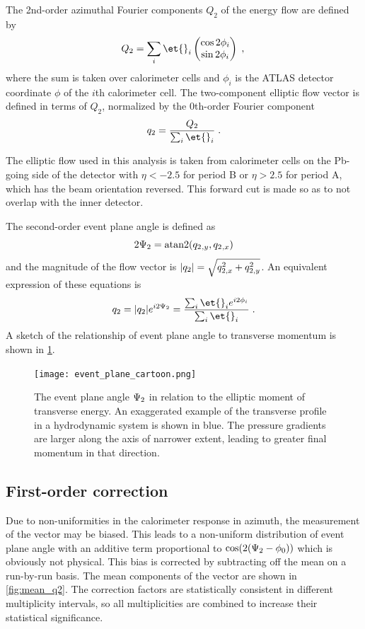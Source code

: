 The 2nd-order azimuthal Fourier components $Q_2$ of the energy flow are defined by
\begin{equation}
  Q_2 = \sum_{i}  \et{}_i \begin{pmatrix} \cos 2\phi_i \\ \sin 2\phi_i \end{pmatrix} \; ,\\
\end{equation}
where the sum is taken over calorimeter cells and $\phi_i$ is the ATLAS detector coordinate $\phi$ of the $i$th calorimeter cell.
The two-component elliptic flow vector \qt is defined in terms of $Q_2$, normalized by the 0th-order Fourier component
\begin{equation}
  \qt = \frac{Q_2}{\sum_i \et{}_i } \; .\\
\end{equation}

The elliptic flow used in this analysis is taken from calorimeter cells on the Pb-going side of the detector with $\eta < -2.5$ for period B or $\eta > 2.5$ for period A, which has the beam orientation reversed. This forward cut is made so as to not overlap with the inner detector.

The second-order event plane angle \psit is defined as
\begin{equation}
2\Psi_{2} = \mathrm{atan2}(q_{2}{}_{,y},q_{2}{}_{,x})
\end{equation}
and the magnitude of the flow vector is $|q_{2}| = \sqrt{q_{2,x}^2 + q_{2,y}^2}$.
An equivalent expression of these equations is
\[
\qt = |\qt| e^{i2\psit} = \frac{\sum_i \et{}_i e^{i2\phi_i}}{\sum_i \et{}_i} \; .
\]
A sketch of the relationship of event plane angle to transverse momentum is shown in \cref{fig:ep_cartoon}.

\begin{figure}[t]
  \centering
  \texttt{[image: event\_plane\_cartoon.png]}
  \caption{The event plane angle $\Psi_{2}$ in relation to the elliptic moment of transverse energy. An exaggerated example of the transverse profile in a hydrodynamic system is shown in blue. The pressure gradients are larger along the axis of narrower extent, leading to greater final momentum in that direction.}
\label{fig:ep_cartoon}
\end{figure}

\subsection{First-order correction}
Due to non-uniformities in the calorimeter response in azimuth, the measurement of the \qt vector may be biased. This leads to a non-uniform distribution of event plane angle \psit with an additive term proportional to $\cos (2(\Psi_{2} - \phi_0))$ which is obviously not physical.
This bias is corrected by subtracting off the mean \qt on a run-by-run basis.
The mean components of the \qt vector are shown in \cref{fig:mean_q2}.
The correction factors are statistically consistent in different multiplicity intervals, so all multiplicities are combined to increase their statistical significance.

